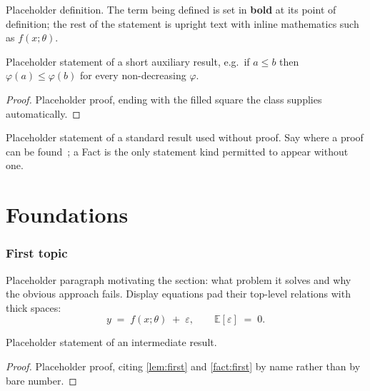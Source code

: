 \documentclass{lecturenotes}
\begin{document}
\begin{definition}\label{def:first}
Placeholder definition. The term being defined is set in
\textbf{bold} at its point of definition; the rest of the statement is
upright text with inline mathematics such as $f(x;\theta)$.
\end{definition}

\begin{lemma}\label{lem:first}
Placeholder statement of a short auxiliary result, e.g.\ if $a \le b$ then
$\varphi(a) \le \varphi(b)$ for every non-decreasing $\varphi$.
\end{lemma}

\begin{proof}
Placeholder proof, ending with the filled square the class supplies
automatically.
\end{proof}

\begin{fact}\label{fact:first}
Placeholder statement of a standard result used without proof. Say where a
proof can be found~\cite{ref-book}; a Fact is the only statement kind
permitted to appear without one.
\end{fact}

\part{Foundations}

\section{First topic}\label{sec:first}

Placeholder paragraph motivating the section: what problem it solves and why
the obvious approach fails. Display equations pad their top-level relations
with thick spaces:
\[
  y \;=\; f(x;\theta) \;+\; \varepsilon,
  \qquad \mathbb E[\varepsilon] \;=\; 0.
\]

\begin{proposition}\label{prop:first}
Placeholder statement of an intermediate result.
\end{proposition}

\begin{proof}
Placeholder proof, citing \cref{lem:first} and \cref{fact:first} by name
rather than by bare number.
\end{proof}
\end{document}
